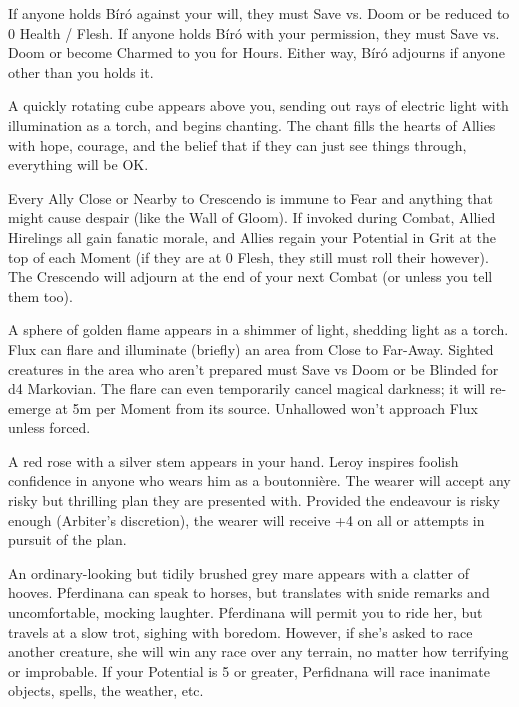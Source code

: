{If anyone holds Bíró against your will, they must Save vs.  Doom or be reduced to 0 Health / Flesh.  If anyone holds Bíró with your permission, they must Save vs. Doom or become Charmed to you for Hours.  Either way,  Bíró adjourns if anyone other than you holds it.


A quickly rotating cube appears above you, sending out rays of electric light with illumination as a torch, and begins chanting.  The chant fills the hearts of Allies with hope, courage, and the belief that if they can just see things through, everything will be OK.

Every Ally Close or Nearby to Crescendo is immune to Fear and anything that might cause despair (like the Wall of Gloom). If invoked during Combat,  Allied Hirelings all gain fanatic morale, and Allies regain your Potential in Grit at the top of each Moment (if they are at 0 Flesh, they still must roll their \DEATH however).  The Crescendo will adjourn at the end of your next Combat (or unless you tell them too).  


A sphere of golden flame appears in a shimmer of light, shedding light as a torch.  Flux can flare and illuminate (briefly) an area from Close to Far-Away.  Sighted creatures in the area who aren't prepared must Save vs Doom or be Blinded for d4 Markovian.  The flare can even temporarily cancel magical darkness; it will re-emerge at 5m per Moment from its source.  Unhallowed won't approach Flux unless forced.


A red rose with a silver stem appears in your hand.  Leroy inspires foolish confidence in anyone who wears him as a boutonnière.  The wearer will accept any risky but thrilling plan they are presented with. Provided the endeavour is risky enough (Arbiter's discretion), the wearer will receive +4 on all \RO or \RB attempts in pursuit of the plan.


An ordinary-looking but tidily brushed grey mare appears with a clatter of hooves.  Pferdinana can speak to horses, but translates with snide remarks and uncomfortable, mocking laughter.  Pferdinana will permit you to ride her, but travels at a slow trot, sighing with boredom.  However, if she's asked to race another creature, she will win any race over any terrain, no matter how terrifying or improbable.  If your Potential is 5 or greater, Perfidnana will race inanimate objects, spells, the weather, etc.

}

